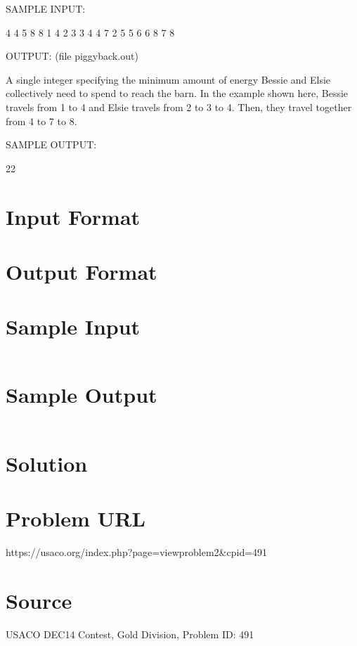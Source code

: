 \documentclass[12pt]{article}
\begin{document}
SAMPLE INPUT:

4 4 5 8 8
1 4
2 3
3 4
4 7
2 5
5 6
6 8
7 8


OUTPUT: (file piggyback.out)

A single integer specifying the minimum amount of energy Bessie and
Elsie collectively need to spend to reach the barn.  In the example
shown here, Bessie travels from 1 to 4 and Elsie travels from 2 to 3
to 4.  Then, they travel together from 4 to 7 to 8.

SAMPLE OUTPUT:

22



\section*{Input Format}


\section*{Output Format}


\section*{Sample Input}
\begin{verbatim}

\end{verbatim}

\section*{Sample Output}
\begin{verbatim}

\end{verbatim}

\section*{Solution}


\section*{Problem URL}
https://usaco.org/index.php?page=viewproblem2&cpid=491

\section*{Source}
USACO DEC14 Contest, Gold Division, Problem ID: 491
\end{document}
